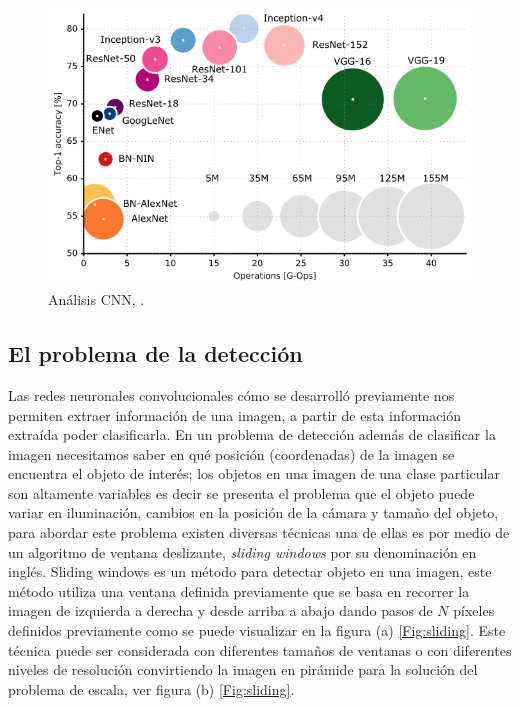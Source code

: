 \begin{figure}[H]
 \centering
  \includegraphics[scale=0.5,keepaspectratio=true,clip=true]{imagenes/MarcoTeorico/cnn-analisis.png}
  \caption{Análisis CNN, \citep{cazani_grap}.}\label{Fig:cnn-analisis}
\end{figure}



\subsection{El problema de la detección}\label{sub:problema_deteccion}


Las redes neuronales convolucionales cómo se desarrolló previamente nos permiten extraer información de una imagen, a partir de esta información extraída poder clasificarla. En un problema de detección además de clasificar la imagen necesitamos saber en qué posición (coordenadas) de la imagen se encuentra el objeto de interés; los objetos en una imagen de una clase particular son altamente variables es decir se presenta el problema que el objeto puede variar en iluminación, cambios en la posición de la cámara y tamaño del objeto, para abordar este problema existen diversas técnicas una de ellas es por medio de un algoritmo de ventana deslizante, \textit{sliding windows} por su denominación en inglés. Sliding windows es un método para detectar objeto en una imagen, este método utiliza una ventana definida previamente que se basa en recorrer la imagen de izquierda a derecha y desde arriba a abajo dando pasos de $N$ píxeles definidos previamente como se puede visualizar en la figura (a) \ref{Fig:sliding}. Este técnica puede ser considerada con diferentes tamaños de ventanas o con diferentes niveles de resolución convirtiendo la imagen en pirámide para la solución del problema de escala, ver figura (b) \ref{Fig:sliding}.



